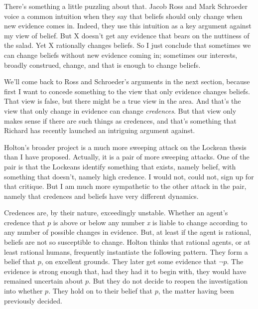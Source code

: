 There's something a little puzzling about that. Jacob Ross and Mark Schroe\-der \citeyearpar{SchroederRoss2012} voice a common intuition when they say that beliefs should only change when new evidence comes in. Indeed, they use this intuition as a key argument against my view of belief. But X doesn't get any evidence that bears on the nuttiness of the salad. Yet X rationally changes beliefs. So I just conclude that sometimes we can change beliefs without new evidence coming in; sometimes our interests, broadly construed, change, and that is enough to change beliefs.

We'll come back to Ross and Schroeder's arguments in the next section, because first I want to concede something to the view that only evidence changes beliefs. That view is false, but there might be a true view in the area. And that's the view that only change in evidence can change \textit{credences}. But that view only makes sense if there are such things as credences, and that's something that Richard \cite{Holton2013} has recently launched an intriguing argument against.

Holton's broader project is a much more sweeping attack on the Lockean thesis than I have proposed. Actually, it is a pair of more sweeping attacks. One of the pair is that the Lockeans identify something that exists, namely belief, with something that doesn't, namely high credence. I would not, could not, sign up for that critique. But I am much more sympathetic to the other attack in the pair, namely that credences and beliefs have very different dynamics.

Credences are, by their nature, exceedingly unstable. Whether an agent's credence that $p$ is above or below any number \textit{x} is liable to change according to any number of possible changes in evidence. But, at least if the agent is rational, beliefs are not so susceptible to change. Holton thinks that rational agents, or at least rational humans, frequently instantiate the following pattern. They form a belief that $p$, on excellent grounds. They later get some evidence that $\neg p$. The evidence is strong enough that, had they had it to begin with, they would have remained uncertain about $p$. But they do not decide to reopen the investigation into whether $p$. They hold on to their belief that $p$, the matter having been previously decided.


